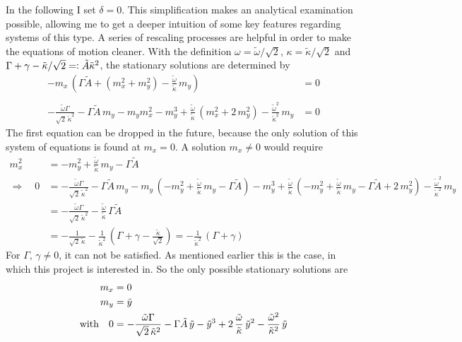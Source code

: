 In the following I set $\delta=0$. This simplification makes an analytical examination possible, allowing me to get a deeper intuition of some key features regarding systems of this type. 
A series of rescaling processes are helpful in order to make the equations of motion cleaner. With the definition $\omega=\tilde{\omega}/\sqrt{2}$, $\kappa=\tilde{\kappa}/\sqrt{2}$ and $\Gamma+\gamma-\tilde{\kappa}/\sqrt{2}=\vcentcolon \tilde{A}\tilde{\kappa}^2$, the stationary solutions are determined by
\begin{align*}
    -m_x\,\left(\Gamma\tilde{A}+( m_x^2+ m_y^2)-\frac{\tilde{\omega}}{\tilde{\kappa}}\,m_y\right)  &=0\\\\
    -\frac{\tilde{\omega}\Gamma}{\sqrt{2}\,\tilde{\kappa}^2}-\Gamma\tilde{A}\,m_y    -m_ym_x^2- m_y^3+\frac{\tilde{\omega}}{\tilde{\kappa}}\,(m_x^2+2\,m_y^2)-\frac{\tilde{\omega}^2}{\tilde{\kappa}^2}\,m_y  &=0
\end{align*}
The first equation can be dropped in the future, because the only solution of this system of equations is found at $m_x=0$. A solution $m_x\neq0$ would require
\begin{align*}
    m_x^2&=-m_y^2+\frac{\tilde{\omega}}{\tilde{\kappa}}\,m_y-\Gamma\tilde{A} \\
    \Rightarrow\quad0&=-\frac{\tilde{\omega}\Gamma}{\sqrt{2}\,\tilde{\kappa}^2}-\Gamma\tilde{A}\,m_y    -m_y\,(-m_y^2+\frac{\tilde{\omega}}{\tilde{\kappa}}\,m_y-\Gamma\tilde{A})- m_y^3+\frac{\tilde{\omega}}{\tilde{\kappa}}\,(-m_y^2+\frac{\tilde{\omega}}{\tilde{\kappa}}\,m_y-\Gamma\tilde{A}+2\,m_y^2)-\frac{\tilde{\omega}^2}{\tilde{\kappa}^2}\,m_y  \\
    &=-\frac{\tilde{\omega}\Gamma}{\sqrt{2}\,\tilde{\kappa}^2}-\frac{\tilde{\omega}}{\tilde{\kappa}}\,\Gamma\tilde{A}\\
    &=-\frac{1}{\sqrt{2}\,\tilde{\kappa}}-\frac{1}{\tilde{\kappa}^2}\,(\Gamma+\gamma-\frac{\tilde{\kappa}}{\sqrt{2}})=-\frac{1}{\tilde{\kappa}^2}\,(\Gamma+\gamma)
\end{align*} 
For $\Gamma,\,\gamma\neq0$, it can not be satisfied. As mentioned earlier this is the case, in which this project is interested in. So the only possible stationary solutions are
\begin{align*}
    m_x&=0\\
    m_y&=\tilde{y}\\
    \text{with}\quad0&=-\frac{\tilde{\omega}\Gamma}{\sqrt{2}\,\tilde{\kappa}^2}-\Gamma\tilde{A}\,\tilde{y}    - \tilde{y}^3+2\,\frac{\tilde{\omega}}{\tilde{\kappa}}\,\tilde{y}^2-\frac{\tilde{\omega}^2}{\tilde{\kappa}^2}\,\tilde{y}  
\end{align*}
